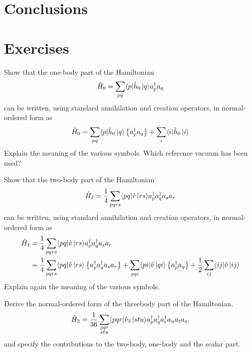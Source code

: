 \section{Conclusions}


\section{Exercises}
\begin{prob} \label{problem:prob8.1}
Show that the one-body part of the Hamiltonian
    \begin{equation*}
        \hat{H}_0 = \sum_{pq} \langle p|\hat{h}_0\,|{q}\rangle a^\dagger_p a_q
    \end{equation*}
can be written, using standard annihilation and creation operators, in normal-ordered form as 
    \[
        \hat{H}_0 = \sum_{pq} \langle p|\hat{h}_0\,|{q}\rangle \left\{a^\dagger_p a_q\right\} +
                \sum_i \langle i|\hat{h}_0\,|{i}\rangle
    \]
Explain the meaning of the various symbols. Which reference 
vacuum has been used?
\end{prob}


\begin{prob} \label{problem:prob8.2}
Show that the two-body part of the Hamiltonian
    \begin{equation*}
        \hat{H}_I = \frac{1}{4} \sum_{pqrs} \langle pq|\hat{v}\,|{rs}\rangle a^\dagger_p a^\dagger_q a_s  a_r
    \end{equation*}
can be written, using standard annihilation and creation operators, in normal-ordered form as 
    \begin{align*}
    \hat{H}_I &= \frac{1}{4} \sum_{pqrs} \langle pq|\hat{v}\,|{rs}\rangle a^\dagger_p a^\dagger_q a_s  a_r \nonumber \\
        &= \frac{1}{4} \sum_{pqrs} \langle pq|\hat{v}\,|{rs}\rangle \left\{a^\dagger_p a^\dagger_q a_s  a_r\right\}
            + \sum_{pqi} \langle pi|\hat{v}\,|{qi}\rangle \left\{a^\dagger_p a_q\right\} 
            + \frac{1}{2} \sum_{ij} \langle ij|\hat{v}\,|{ij}\rangle
    \end{align*}
Explain again the meaning of the various symbols.
\end{prob}



\begin{prob}\label{problem:prob8.3}
Derive the normal-ordered form of the threebody part of the Hamiltonian.
\[
    \hat{H}_3 = \frac{1}{36} \sum_{\substack{
                        pqr \\
                        stu}}
                 \langle pqr|\hat{v}_3\,|{stu}\rangle a^\dagger_p a^\dagger_q a^\dagger_r a_u a_t a_s,
\]
and specify the contributions to the two-body, one-body and the scalar part.
\end{prob}




